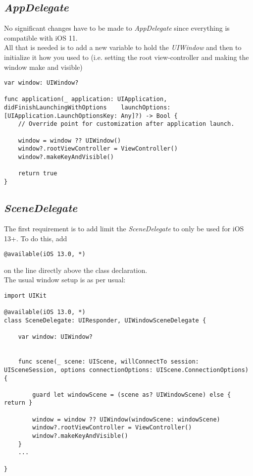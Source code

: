 \documentclass[]{article}
\newcommand{\<}{\guilsinglleft}
\renewcommand{\>}{\guilsinglright}
\renewcommand{\it}[1]{\textit{#1}}
\begin{document}
\subsection{\it{AppDelegate}}
No significant changes have to be made to \it{AppDelegate} since everything is compatible with iOS 11.  
\\
All that is needed is to add a new variable to hold the \it{UIWindow} and then to initialize it how you used to (i.e. setting the root view-controller and making the window make and visible) 
\begin{lstlisting}
var window: UIWindow?

func application(_ application: UIApplication, didFinishLaunchingWithOptions 	launchOptions: [UIApplication.LaunchOptionsKey: Any]?) -> Bool {
	// Override point for customization after application launch.
	
	window = window ?? UIWindow()
	window?.rootViewController = ViewController()
	window?.makeKeyAndVisible()
	
	return true
}
\end{lstlisting}

\subsection{\it{SceneDelegate}}
The first requirement is to add limit the \it{SceneDelegate} to only be used for iOS 13+.  To do this, add  
\begin{lstlisting}
@available(iOS 13.0, *)
\end{lstlisting}
on the line directly above the class declaration.
\\
The usual window setup is as per usual:
\begin{lstlisting}
import UIKit

@available(iOS 13.0, *)
class SceneDelegate: UIResponder, UIWindowSceneDelegate {
	
	var window: UIWindow?
	
	
	func scene(_ scene: UIScene, willConnectTo session: UISceneSession, options connectionOptions: UIScene.ConnectionOptions) {
	
		guard let windowScene = (scene as? UIWindowScene) else { return }
		
		window = window ?? UIWindow(windowScene: windowScene)
		window?.rootViewController = ViewController()
		window?.makeKeyAndVisible()
	}
	...
	
}
\end{lstlisting}
\end{document}
